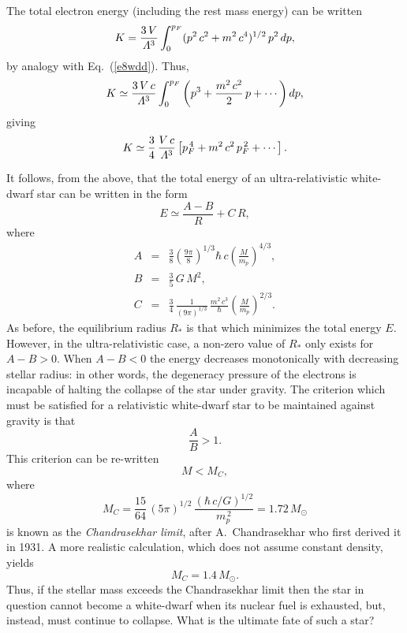 The total electron energy (including the rest mass energy) can be
written
\begin{equation}
K = \frac{3\,V}{{\mit\Lambda}^3}\int_0^{p_F} (p^2\,c^2
+m^2\,c^4)^{1/2}\,p^2\,dp,
\end{equation}
by analogy with Eq.~(\ref{e8wdd}). Thus,
\begin{equation}
K\simeq \frac{3\,V\,c}{{\mit\Lambda}^3}\int_0^{p_F} \left(p^3
+ \frac{m^2\,c^2}{2}\,p + \cdots\right)dp,
\end{equation}
giving
\begin{equation}
K \simeq \frac{3}{4}\,\frac{V\,c}{{\mit\Lambda}^3}
\left[p_F^{\,4} + m^2\,c^2\,p_F^{\,2}+\cdots \right].
\end{equation}

It follows, from the above, that the total energy of an ultra-relativistic
white-dwarf star can be written
in the
form
\begin{equation}
E \simeq \frac{A-B}{R} + C\,R,
\end{equation}
where
\begin{eqnarray}
A &=& \frac{3}{8}\left(\frac{9\pi}{8}\right)^{1/3} \!\hbar\,c\left(\frac{M}{m_p}
\right)^{4/3},\\[0.5ex]
B&=& \frac{3}{5}\,G\,M^2,\\[0.5ex]
C&=& \frac{3}{4}\,\frac{1}{(9\pi)^{1/3}}\,
\frac{m^2\,c^3}{\hbar} \left(\frac{M}{m_p}\right)^{2/3}.
\end{eqnarray}
As before, the equilibrium radius $R_\ast$ is that which minimizes the
total energy $E$. 
However, in the ultra-relativistic case, a non-zero value of $R_\ast$ only exists
for $A-B>0$. When $A-B<0$ the energy decreases monotonically with decreasing
stellar radius: in other words, the degeneracy pressure 
of the electrons is incapable of halting the collapse of the star under gravity.
The criterion which must be satisfied for a relativistic white-dwarf
star to be maintained against gravity is that
\begin{equation}
\frac{A}{B} > 1.
\end{equation}
This criterion can be re-written
\begin{equation}
M< M_C,
\end{equation}
where
\begin{equation}
M_C = \frac{15}{64}\,(5\pi)^{1/2} \,\frac{(\hbar\,c/G)^{1/2}}{m_p^{\,2}}=
1.72\,M_\odot
\end{equation}
is known as the {\em Chandrasekhar limit}, after  A.~Chandrasekhar
who first derived it in 1931.
A  more realistic calculation, which does not assume constant density,
yields
\begin{equation}
M_C = 1.4\,M_\odot.
\end{equation}
Thus, if the stellar mass exceeds the Chandrasekhar limit then the star in question
cannot become a white-dwarf when its nuclear fuel is exhausted, but, instead,
must continue to 
collapse. What is the ultimate fate of such a star?


